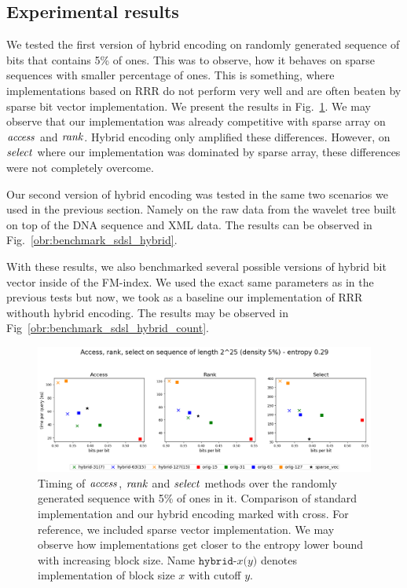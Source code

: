 \subsection{Experimental results}


We tested the first version of hybrid encoding on randomly generated sequence of bits that contains 5\% of ones.
This was to observe, how it behaves on sparse sequences with smaller percentage of ones. This is something, where
implementations based on RRR do not perform very well and are often beaten by sparse bit vector implementation.
We present the results in Fig.~\ref{obr:vysledky_hybrid_artif}. We may observe that our implementation was already
competitive with sparse array on $\mathit{access}$ and $\mathit{rank}$. Hybrid encoding only amplified these differences. However,
on $\mathit{select}$ where our implementation was dominated by sparse array, these differences were not completely overcome.

Our second version of hybrid encoding was tested in the same two scenarios we used in the previous section. Namely
on the raw data from the wavelet tree built on top of the DNA sequence and XML data. The results can be observed in
Fig.~\ref{obr:benchmark_sdsl_hybrid}.

With these results, we also benchmarked several possible versions of hybrid bit vector inside of the FM-index.
We used the exact same parameters as in the previous tests but now, we took as a baseline our implementation of RRR
withouth hybrid encoding. The results may be observed in Fig~\ref{obr:benchmark_sdsl_hybrid_count}.

\begin{figure}
	\centerline{
		\includegraphics[width=\textwidth, height=0.27\textheight]{images/vysledky_hybrid_artif}
	}
	\caption[TODO]{Timing of $\mathit{access}$, $\mathit{rank}$ and $\mathit{select}$ methods over the randomly generated
	sequence with 5\% of ones in it. Comparison of standard implementation and our hybrid encoding
	marked with cross. For reference, we included sparse vector implementation. We may observe how
	implementations get closer to the entropy lower bound with increasing block size. Name
	$\texttt{hybrid-}x\texttt{(}y\texttt{)}$ denotes implementation of block size $x$ with cutoff $y$.
	}
	\label{obr:vysledky_hybrid_artif}
\end{figure}

